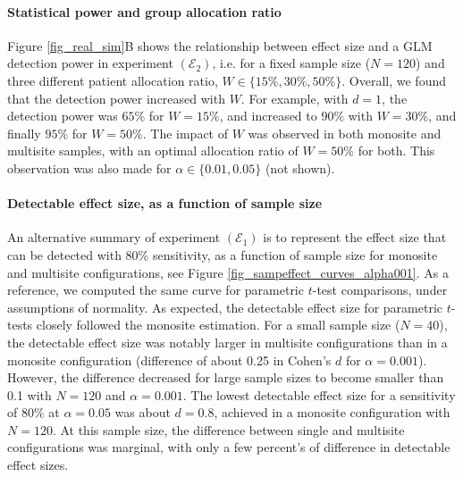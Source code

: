 \documentclass[authoryear]{elsarticle}
\begin{document}
\paragraph{Statistical power and group allocation ratio} Figure \ref{fig_real_sim}B shows the relationship between effect size and a GLM detection power in experiment $(\mathcal{E}_2)$, i.e. for a fixed sample size ($N=120$) and three different patient allocation ratio, $W\in \{15\%, 30\%,50\%\}$. Overall, we found that the detection power increased with $W$. For example, with $d=1$, the detection power was $65\%$ for $W=15\%$, and increased to $90\%$ with $W=30\%$, and finally $95\%$ for $W=50\%$. The impact of $W$ was observed in both monosite and multisite samples, with an optimal allocation ratio of $W=50\%$ for both. This observation was also made for $\alpha\in\{0.01,0.05\}$ (not shown). 

\paragraph{Detectable effect size, as a function of sample size} An alternative summary of experiment $(\mathcal{E}_1)$ is to represent the effect size that can be detected with 80\% sensitivity, as a function of sample size for monosite and multisite configurations, see Figure \ref{fig_sampeffect_curves_alpha001}. As a reference, we computed the same curve for parametric $t$-test comparisons, under assumptions of normality. As expected, the detectable effect size for parametric $t$-tests closely followed the monosite estimation. For a small sample size ($N=40$), the detectable effect size was notably larger in multisite configurations than in a monosite configuration (difference of about 0.25 in Cohen's $d$ for $\alpha=0.001$). However, the difference decreased for large sample sizes to become smaller than 0.1 with $N=120$ and $\alpha=0.001$. The lowest detectable effect size for a sensitivity of $80\%$ at $\alpha=0.05$ was about $d=0.8$, achieved in a monosite configuration with $N=120$. At this sample size, the difference between single and multisite configurations was marginal, with only a few percent's of difference in detectable effect sizes. 
\end{document}
